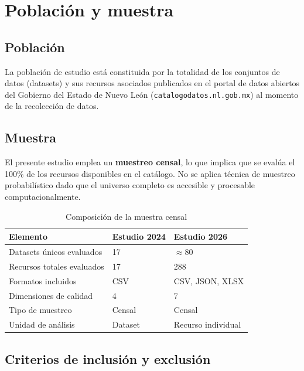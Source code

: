 \documentclass[12pt,letterpaper]{article}
\begin{document}
\section{Población y muestra}

\subsection{Población}

La población de estudio está constituida por la totalidad de los conjuntos de datos (datasets) y sus recursos asociados publicados en el portal de datos abiertos del Gobierno del Estado de Nuevo León (\texttt{catalogodatos.nl.gob.mx}) al momento de la recolección de datos.

\subsection{Muestra}

El presente estudio emplea un \textbf{muestreo censal}, lo que implica que se evalúa el 100\% de los recursos disponibles en el catálogo. No se aplica técnica de muestreo probabilístico dado que el universo completo es accesible y procesable computacionalmente.

\begin{table}[h]
\centering
\caption{Composición de la muestra censal}
\label{tab:muestra}
\begin{tabular}{lll}
\toprule
\textbf{Elemento} & \textbf{Estudio 2024} & \textbf{Estudio 2026} \\
\midrule
Datasets únicos evaluados & 17 & $\approx$80 \\
Recursos totales evaluados & 17 & 288 \\
Formatos incluidos & CSV & CSV, JSON, XLSX \\
Dimensiones de calidad & 4 & 7 \\
Tipo de muestreo & Censal & Censal \\
Unidad de análisis & Dataset & Recurso individual \\
\bottomrule
\end{tabular}
\end{table}

\subsection{Criterios de inclusión y exclusión}
\end{document}
